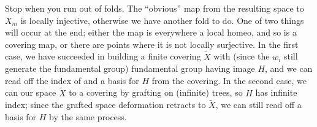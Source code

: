 \ssk

Stop when you run out of folds. The ``obvious'' map from the resulting space to $X_m$ is locally
injective, otherwise we have another fold to do.
One of two things will occur at the end; either the map is everywhere a local homeo, and so is a covering
map, or there are points where it is not locally surjective. In the first case, we have succeeded
in building a finite covering $\widetilde{X}$ with 
(since the $w_i$ still generate the fundamental group) fundamental group having image $H$, and we can 
read off the index of and a basis for $H$ from the covering. In the second case, we can
 our space $\widetilde{X}$ to a covering by grafting on (infinite) trees, so $H$ has
infinite index; since the grafted space deformation retracts to $\widetilde{X}$,
we can still read off a basis for $H$ by the same process.
